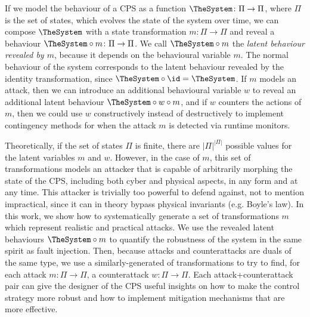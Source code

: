 If we model the behaviour of a CPS as a function $\TheSystem\colon\Pi\rightarrow\Pi$, where $\Pi$ is the set of states, which evolves the state of the system over time, we can compose $\TheSystem$ with a state transformation $m\colon \Pi\rightarrow\Pi$ and reveal a behaviour $\TheSystem\circ m\colon\Pi\rightarrow\Pi$. We call $\TheSystem\circ m$ the \emph{latent behaviour revealed by $m$}, because it depends on the behavioural variable $m$. The normal behaviour of the system corresponds to the latent behaviour revealed by the identity transformation, since $\TheSystem\circ \id=\TheSystem$. If $m$ models an attack, then we can introduce an additional behavioural variable $w$ to reveal an additional latent behaviour $\TheSystem\circ w\circ m$, and if $w$ counters the actions of $m$, then we could use $w$ constructively instead of destructively to implement contingency methods for when the attack $m$ is detected via runtime monitors.

Theoretically, if the set of states $\Pi$ is finite, there are $|\Pi|^{|\Pi|}$ possible values for the latent variables $m$ and $w$.  However, in the case of $m$, this set of transformations models an attacker that is capable of arbitrarily morphing the state of the CPS, including both cyber and physical aspects, in any form and at any time. This attacker is trivially too powerful to defend against, not to mention impractical, since it can in theory bypass physical invariants (e.g. Boyle's law). In this work, we show how to systematically generate a set of transformations $m$ which represent realistic and practical attacks. We use the revealed latent behaviours $\TheSystem\circ m$ to quantify the robustness of the system in the same spirit as fault injection. Then, because attacks and counterattacks are duals of the same type, we use a similarly-generated of transformations to try to find, for each attack $m\colon\Pi\rightarrow\Pi$, a counterattack $w\colon\Pi\rightarrow\Pi$. Each attack+counterattack pair can give the designer of the CPS useful insights on how to make the control strategy more robust and how to implement mitigation mechanisms that are more effective.

